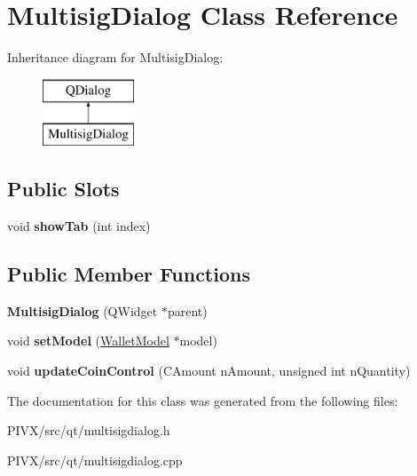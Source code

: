 \hypertarget{class_multisig_dialog}{}\section{Multisig\+Dialog Class Reference}
\label{class_multisig_dialog}
Inheritance diagram for Multisig\+Dialog\+:\begin{figure}[H]
\begin{center}
\leavevmode
\includegraphics[height=2.000000cm]{class_multisig_dialog}
\end{center}
\end{figure}
\subsection*{Public Slots}
\begin{DoxyCompactItemize}
\item 
\mbox{\label{class_multisig_dialog_a2fc79dce0675edaa3e25caf8969a77b5}} 
void {\bfseries show\+Tab} (int index)
\end{DoxyCompactItemize}
\subsection*{Public Member Functions}
\begin{DoxyCompactItemize}
\item 
\mbox{\label{class_multisig_dialog_af8ff2a9f6dc05a9468d955cb428c6474}} 
{\bfseries Multisig\+Dialog} (Q\+Widget $\ast$parent)
\item 
\mbox{\label{class_multisig_dialog_ae2709a2ffd629acafa4c90811402c64a}} 
void {\bfseries set\+Model} (\mbox{\hyperlink{class_wallet_model}{Wallet\+Model}} $\ast$model)
\item 
\mbox{\label{class_multisig_dialog_ad0e2804a0a618393be5ea6b4752052e2}} 
void {\bfseries update\+Coin\+Control} (C\+Amount n\+Amount, unsigned int n\+Quantity)
\end{DoxyCompactItemize}


The documentation for this class was generated from the following files\+:\begin{DoxyCompactItemize}
\item 
P\+I\+V\+X/src/qt/multisigdialog.\+h\item 
P\+I\+V\+X/src/qt/multisigdialog.\+cpp\end{DoxyCompactItemize}
